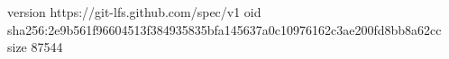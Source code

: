 version https://git-lfs.github.com/spec/v1
oid sha256:2e9b561f96604513f384935835bfa145637a0c10976162c3ae200fd8bb8a62cc
size 87544
